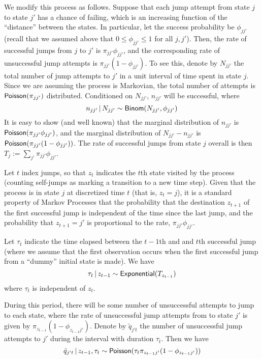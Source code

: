 We modify this process as follows.  
Suppose that each jump attempt from state $j$ to state $j'$ has a
chance of failing, which is an increasing function of the ``distance''
between the states.  In particular, let the success probability be
$\phi_{jj'}$ (recall that we assumed above that $0 \leq \phi_{jj'}
\leq 1$ for all $j,j'$).  Then, the rate of successful jumps from $j$
to $j'$ is $\pi_{jj'}\phi_{jj'}$, and the corresponding rate of unsuccessful jump
attempts is $\pi_{jj'}(1-\phi_{jj'})$.  To see this, denote by
$N_{jj'}$ the total number of jump attempts to $j'$ in a unit
interval of time spent in state $j$.  Since we are assuming the
process is Markovian, the total number of attempts is $\mathsf{Poisson}(\pi_{jj'})$
distributed.  Conditioned on $N_{jj'}$, $n_{jj'}$ will be successful, where
\begin{equation}
  \label{eq:51}
  n_{jj'} \, \vert \, N_{jj'} \sim \mathsf{Binom}(N_{jj'},\phi_{jj'})
\end{equation}
It is easy to show (and well known) that the marginal distribution of
$n_{jj'}$ is $\mathsf{Poisson}(\pi_{jj'}\phi_{jj'})$, and the marginal
distribution of $N_{jj'} - n_{jj'}$ is
$\mathsf{Poisson}(\pi_{jj'}(1-\phi_{jj'}))$.  The rate of successful jumps
from state $j$ overall is then $T_j := \sum_{j'} \pi_{jj'} \phi_{jj'}$.

Let $t$ index jumps, so that $z_t$ indicates the $t$th state visited
by the process (counting self-jumps as marking a transition to a new
time step).  Given
that the process is in state $j$ at discretized time $t$ (that is,
$z_{t} = j$), it is a standard property of Markov Processes that 
the probability that the destination $z_{t+1}$ of the first successful jump
is independent of the time since the last jump, and the probability
that $z_{t+1} = j'$ is proportional to the rate, $\pi_{jj'}\phi_{jj'}$.  

Let $\tau_{t}$ indicate the time elapsed between the $t-1$th and 
and $t$th successful jump (where we assume that the first
observation occurs when the first successful jump from a ``dummy'' initial
state is made).  We have
\begin{equation}
  \label{eq:52}
  \tau_t \, \vert \, z_{t-1} \sim \mathsf{Exponential}(T_{z_{t-1}})
\end{equation}
where $\tau_t$ is independent of $z_{t}$.

During this period, there will be some number of unsuccessful attempts to
jump to each state, where the rate of unsuccessful jump attempts from
to state $j'$ is given by $\pi_{z_{t-1}}(1 - \phi_{z_{t-1}j'})$.
Denote by $\tilde{q}_{j't}$ the number of unsuccessful jump attempts
to $j'$ during the interval with duration $\tau_t$.  Then we have
\begin{equation}
  \label{eq:53}
  \tilde{q}_{j't} \, \vert \, z_{t-1}, \tau_t \sim \mathsf{Poisson}(\tau_t \pi_{z_{t-1}j'}(1-\phi_{z_{t-1}j'}))
\end{equation}

